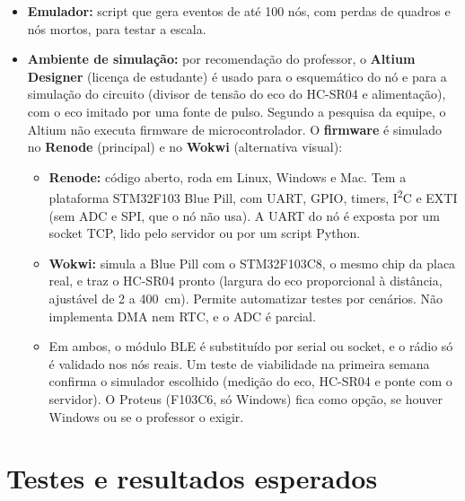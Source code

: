 \documentclass[11pt,a4paper]{article}
\begin{document}
\begin{itemize}
        da gestão (ocupação, uso e frequência por máquina e alertas), com
        atualização em tempo real.
  \item \textbf{Emulador:} script que gera eventos de até 100 nós, com perdas de
        quadros e nós mortos, para testar a escala.
  \item \textbf{Ambiente de simulação:} por recomendação do professor, o
        \textbf{Altium Designer} (licença de estudante) é usado para o
        esquemático do nó e para a simulação do circuito (divisor de tensão do
        eco do HC-SR04 e alimentação), com o eco imitado por uma fonte de pulso.
        Segundo a pesquisa da equipe, o Altium não executa firmware de
        microcontrolador. O \textbf{firmware} é simulado no \textbf{Renode}
        (principal) e no \textbf{Wokwi} (alternativa visual):
        \begin{itemize}
          \item \textbf{Renode:} código aberto, roda em Linux, Windows e Mac. Tem a
                plataforma STM32F103 Blue Pill, com UART, GPIO, timers, I\textsuperscript{2}C
                e EXTI (sem ADC e SPI, que o nó não usa). A UART do nó é exposta
                por um socket TCP, lido pelo servidor ou por um script Python.
          \item \textbf{Wokwi:} simula a Blue Pill com o STM32F103C8, o mesmo chip da
                placa real, e traz o HC-SR04 pronto (largura do eco proporcional
                à distância, ajustável de 2 a 400~cm). Permite automatizar testes
                por cenários. Não implementa DMA nem RTC, e o ADC é parcial.
          \item Em ambos, o módulo BLE é substituído por serial ou socket, e o
                rádio só é validado nos nós reais. Um teste de viabilidade na
                primeira semana confirma o simulador escolhido (medição do eco,
                HC-SR04 e ponte com o servidor). O Proteus (F103C6, só Windows)
                fica como opção, se houver Windows ou se o professor o exigir.
        \end{itemize}
\end{itemize}

\section{Testes e resultados esperados}
\end{document}
